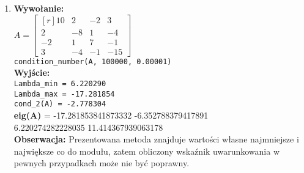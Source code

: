 \documentclass[]{article}
\begin{document}
\begin{enumerate}
\item \textbf{Wywołanie:}\\
$A = \begin{bmatrix*}[r]
    10 &    2  &  -2 &    3\\
    2   & -8   &  1  &  -4\\
    -2 &    1&     7  &  -1\\
    3 &   -4  &  -1  & -15
\end{bmatrix*}$\\
\verb|condition_number(A, 100000, 0.00001)|
\\\textbf{Wyjście:}\\
\verb|Lambda_min = 6.220290|\\
\verb|Lambda_max = -17.281854|\\
\verb|cond_2(A) = -2.778304|\\
\textbf{eig(A)} =   -17.281853841873332 -6.352788379417891\\ 6.220274282228035 11.414367939063178\\
\textbf{Obserwacja:} Prezentowana metoda znajduje wartości własne najmniejsze i największe co do modułu, zatem obliczony wskaźnik uwarunkowania w pewnych przypadkach może nie być poprawny.
\end{enumerate}
\end{document}
